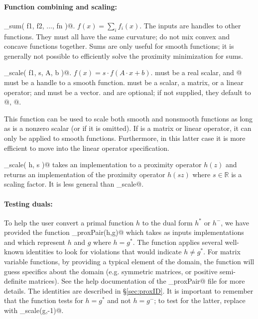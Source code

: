 \documentclass{article}
\newcommand{\<}{\langle}
\renewcommand{\>}{\rangle}
\newcommand{\R}{\mathbb{R}}
\begin{document}
\paragraph{Function combining and scaling:}
\begin{trivlist}
\item \verb@tfunc_sum( f1, f2, ..., fn )@. $f(x)=\sum_i f_i(x)$. The
inputs are handles to other functions. They must all have the same curvature;
do not mix convex and concave functions together.
Sums are only useful for smooth functions; it is generally not possible
to efficiently solve the proximity minimization for sums.
\item \verb@tfunc_scale( f1, s, A, b )@. $f(x)=s\cdot f(A\cdot x + b)$. \verb@s@ must
be a real scalar, and @ must be a handle to a smooth function. \verb@A@
must be a scalar, a matrix, or a linear operator; and \verb@b@ must be a vector.
\verb@A@ and \verb@b@ are optional; if not supplied, they default to @, @.

This function can be used to scale both smooth and nonsmooth functions
as long as \verb@A@ is a nonzero scalar (or if it is omitted). If \verb@A@
is a matrix or linear operator, it can only be applied to smooth functions.
Furthermore, in this latter case it is more efficient to move \verb@A@ into the
linear operator specification.

\item \verb@prox_scale( h, s )@ takes an implementation \verb@h@ to a proximity operator $h(z)$
    and returns an implementation of the proximity operator $h(sz)$ where $s \in \R$ is a scaling factor.
    It is less general than \verb@tfunc_scale@.
\end{trivlist}


\paragraph{Testing duals:}

To help the user convert a primal function $h$ to the dual form $h^*$ or $h^{-}$, we have
provided the function \verb@test_proxPair(h,g)@ which takes as inputs implementations \verb@h@
and \verb@g@ which represent $h$ and $g$ where $h = g^*$.  The function applies
several well-known identities to look for violations that would indicate $h \neq g^*$.
For matrix variable functions, by providing a typical element of the domain, the function will guess specifics about the domain (e.g. symmetric matrices, or positive semi-definite matrices). 
See the help documentation of the \verb@test_proxPair@ file for more details.  
The identities are described in \S\ref{sec:proxID}.
It is important to remember that the function tests for $h=g^*$ and not $h=g^{-}$;
to test for the latter, replace \verb@g@ with \verb@prox_scale(g,-1)@.
\end{document}
